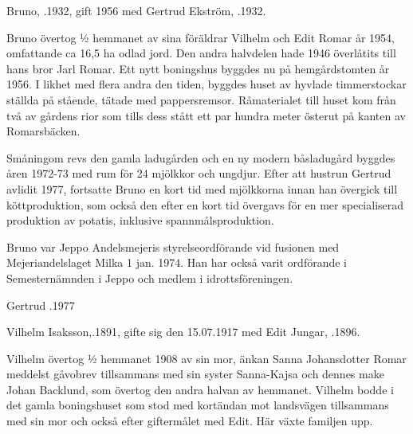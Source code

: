%
Bruno, .1932, gift 1956 med Gertrud Ekström, .1932.
\begin{jhchildren}
   \item {}
   \item {}
   \item {}
   \item {}
\end{jhchildren}
Bruno övertog ½ hemmanet av sina föräldrar Vilhelm och  Edit Romar år 1954, omfattande ca 16,5 ha odlad jord. Den andra halvdelen hade 1946 överlåtits till hans bror Jarl Romar. Ett nytt boningshus byggdes nu på hemgårdstomten år 1956. I likhet med flera andra den tiden, byggdes huset av hyvlade timmerstockar ställda på stående, tätade med pappersremsor. Råmaterialet till huset kom från två av gårdens rior som tills dess stått ett par hundra meter österut på kanten av Romarsbäcken.

Småningom revs den gamla ladugården och en ny modern båsladugård byggdes åren 1972-73 med rum för 24 mjölkkor och ungdjur. Efter att hustrun Gertrud avlidit 1977, fortsatte Bruno en kort tid med mjölkkorna innan han övergick till köttproduktion, som också den efter en kort tid övergavs för en mer specialiserad produktion av potatis, inklusive spannmålsproduktion.

Bruno var Jeppo Andelsmejeris styrelseordförande vid fusionen med Mejeriandelslaget Milka 1 jan. 1974. Han har också varit ordförande i Semesternämnden i Jeppo och medlem i idrottsföreningen.

Gertrud .1977


%



%
Vilhelm Isaksson,.1891, gifte sig den 15.07.1917 med Edit Jungar, .1896.

Vilhelm  övertog  ½ hemmanet 1908 av sin mor, änkan Sanna Johansdotter Romar meddelst gåvobrev tillsammans med sin syster Sanna-Kajsa och dennes make Johan Backlund, som övertog den andra halvan av hemmanet. Vilhelm bodde i det  gamla boningshuset som stod med kortändan mot landsvägen tillsammans med sin mor och också efter giftermålet med Edit. Här växte familjen upp.

